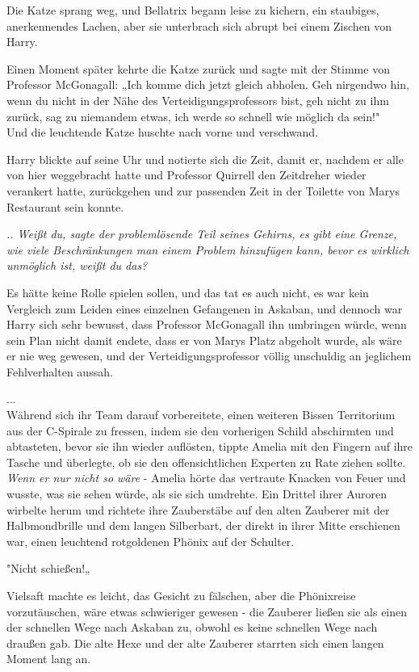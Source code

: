 {Die Katze sprang weg, und Bellatrix begann leise zu kichern, ein staubiges, anerkennendes Lachen, aber sie unterbrach sich abrupt bei einem Zischen von Harry.

Einen Moment später kehrte die Katze zurück und sagte mit der Stimme von Professor McGonagall: „Ich komme dich jetzt gleich abholen. Geh nirgendwo hin, wenn du nicht in der Nähe des Verteidigungsprofessors bist, geh nicht zu ihm zurück, sag zu niemandem etwas, ich werde so schnell wie möglich da sein!"\\ Und die leuchtende Katze huschte nach vorne und verschwand.

Harry blickte auf seine Uhr und notierte sich die Zeit, damit er, nachdem er alle von hier weggebracht hatte und Professor Quirrell den Zeitdreher wieder verankert hatte, zurückgehen und zur passenden Zeit in der Toilette von Marys Restaurant sein konnte.

\emph{.. Weißt du, sagte der problemlösende Teil seines Gehirns, es gibt eine Grenze, wie viele Beschränkungen man einem Problem hinzufügen kann, bevor es wirklich unmöglich ist, weißt du das?}

Es hätte keine Rolle spielen sollen, und das tat es auch nicht, es war kein Vergleich zum Leiden eines einzelnen Gefangenen in Askaban, und dennoch war Harry sich sehr bewusst, dass Professor McGonagall ihn umbringen würde, wenn sein Plan nicht damit endete, dass er von Marys Platz abgeholt wurde, als wäre er nie weg gewesen, und der Verteidigungsprofessor völlig unschuldig an jeglichem Fehlverhalten aussah.

...\\ Während sich ihr Team darauf vorbereitete, einen weiteren Bissen Territorium aus der C-Spirale zu fressen, indem sie den vorherigen Schild abschirmten und abtasteten, bevor sie ihn wieder auflösten, tippte Amelia mit den Fingern auf ihre Tasche und überlegte, ob sie den offensichtlichen Experten zu Rate ziehen sollte. \emph{Wenn er nur nicht so wäre} - Amelia hörte das vertraute Knacken von Feuer und wusste, was sie sehen würde, als sie sich umdrehte. Ein Drittel ihrer Auroren wirbelte herum und richtete ihre Zauberstäbe auf den alten Zauberer mit der Halbmondbrille und dem langen Silberbart, der direkt in ihrer Mitte erschienen war, einen leuchtend rotgoldenen Phönix auf der Schulter.

"Nicht schießen!„

Vielsaft machte es leicht, das Gesicht zu fälschen, aber die Phönixreise vorzutäuschen, wäre etwas schwieriger gewesen - die Zauberer ließen sie als einen der schnellen Wege nach Askaban zu, obwohl es keine schnellen Wege nach draußen gab. Die alte Hexe und der alte Zauberer starrten sich einen langen Moment lang an.

}
